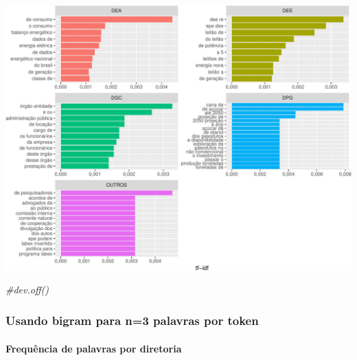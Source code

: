 \documentclass[]{article}
\newenvironment{Shaded}{\begin{snugshade}}{\end{snugshade}}
\newcommand{\CommentTok}[1]{\textcolor[rgb]{0.56,0.35,0.01}{\textit{#1}}}
\let\oldparagraph\paragraph
\renewcommand{\paragraph}[1]{\oldparagraph{#1}\mbox{}}
\begin{document}
\includegraphics{markdown_v30_files/figure-latex/03_freq_palavras_dir-1.pdf}

\begin{Shaded}
\begin{Highlighting}[]
\CommentTok{#dev.off()}
\end{Highlighting}
\end{Shaded}

\subsubsection{Usando bigram para n=3 palavras por
token}\label{usando-bigram-para-n3-palavras-por-token}

\paragraph{Frequência de palavras por
diretoria}\label{frequencia-de-palavras-por-diretoria-5}
\end{document}
